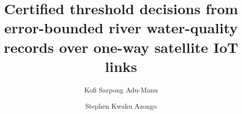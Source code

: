 \documentclass[preprint,12pt,authoryear]{elsarticle}
\begin{document}
\begin{frontmatter}

\title{Certified threshold decisions from error-bounded river water-quality records over one-way satellite IoT links}

\author[ug]{Kofi Sarpong Adu-Manu}
\author[ug]{Stephen Kwaku Azongo}



\end{frontmatter}













\end{document}

